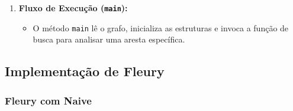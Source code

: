 \documentclass[12pt]{article}
\begin{document}
\begin{enumerate}
    \item \textbf{Fluxo de Execu\c{c}\~ao (\texttt{main}):}
    \begin{itemize}
        \item O m\'etodo \texttt{main} l\^e o grafo, inicializa as estruturas e invoca a fun\c{c}\~ao de busca para analisar uma aresta espec\'ifica.
    \end{itemize}
\end{enumerate}

\subsection{Implementação de Fleury }

\subsubsection{Fleury com Naive}
\end{document}
